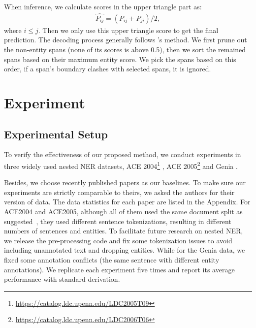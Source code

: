 \documentclass[11pt]{article}
\begin{document}
When inference, we calculate scores in the upper triangle part as:
\begin{align}
  \hat{P_{ij}} = (P_{ij} + P_{ji})/2, \nonumber
\end{align}
where $i\le j$. Then we only use this upper triangle score to get the final prediction. The decoding process generally follows \citet{DBLP:conf/acl/YuBP20}'s method. We first prune out the non-entity spans (none of its scores is above 0.5), then we sort the remained spans based on their maximum entity score. We pick the spans based on this order, if a span's boundary clashes with selected spans, it is ignored. 



\section{Experiment}
\subsection{Experimental Setup}
To verify the effectiveness of our proposed method, we conduct experiments in three widely used nested NER datasets, ACE 2004\footnote{\url{https://catalog.ldc.upenn.edu/LDC2005T09}} \cite{DBLP:conf/lrec/DoddingtonMPRSW04}, ACE 2005\footnote{\url{https://catalog.ldc.upenn.edu/LDC2006T06}} \cite{walker2005ace} and Genia \cite{DBLP:conf/ismb/KimOTT03}. 

Besides, we choose recently published papers as our baselines. To make sure our experiments are strictly comparable to theirs, we asked the authors for their version of data. The data statistics for each paper are listed in the Appendix. For ACE2004 and ACE2005, although all of them used the same document split as suggested~\cite{DBLP:conf/emnlp/LuR15}, they used different sentence tokenizations, resulting in different numbers of sentences and entities. To facilitate future research on nested NER, we release the pre-processing code and fix some tokenization issues to avoid including unannotated text and dropping entities. While for the Genia data, we fixed some annotation conflicts (the same sentence with different entity annotations). We replicate each experiment five times and report its average performance with standard derivation. 
\end{document}
